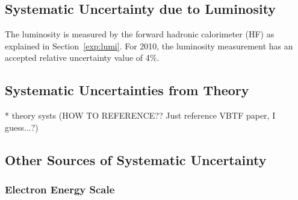 \subsection{Systematic Uncertainty due to Luminosity}
\label{anMeth:SystsLumi}


The luminosity is measured by the forward hadronic calorimeter (HF) 
as explained in Section~\ref{exp:lumi}.  
For 2010, the luminosity measurement has an accepted 
relative uncertainty value of 4\%.  

\subsection{Systematic Uncertainties from Theory}
\label{anMeth:SystsTheory}

   * theory systs (HOW TO REFERENCE??  Just reference VBTF paper, I guess...?)

\subsection{Other Sources of Systematic Uncertainty}
\label{anMeth:SystsOther}


\subsubsection{Electron Energy Scale}
\label{anMeth:SystsOtherEleEScale}


